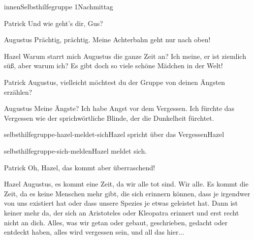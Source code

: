 \documentclass[12pt]{article}
\begin{document}
\begin{scene}[cut to]{innen}{Selbsthilfegruppe 1}{Nachmittag}
        \begin{dialog}{Patrick}
            Und wie geht's dir, Gus?
        \end{dialog}

        \begin{dialog}{Augustus}
            Prächtig, prächtig.
            Meine Achterbahn geht nur nach oben!
        \end{dialog}

        \begin{dialog}[IN Gedanken]{Hazel}
            Warum starrt mich Augustus die ganze Zeit an?
            Ich meine, er ist ziemlich süß, aber warum ich?
            Es gibt doch so viele schöne Mädchen in der Welt!
        \end{dialog}

        \begin{dialog}{Patrick}
            \gls{Augustus}, vielleicht möchtest du der Gruppe von deinen Ängsten erzählen?
        \end{dialog}

        \begin{dialog}{Augustus}
            Meine Ängste?
            Ich habe Angst vor dem Vergessen.
            Ich fürchte das Vergessen wie der sprichwörtliche Blinde, der die Dunkelheit fürchtet.
        \end{dialog}

        \begin{decision}{selbsthilfegruppe-hazel-meldet-sich}{\gls{Hazel} spricht über das Vergessen}{\gls{Hazel}}
            \begin{option}{selbsthilfegruppe-sich-melden}{\gls{Hazel} meldet sich.}

                \begin{dialog}{Patrick}
                    Oh, \gls{Hazel}, das kommt aber überraschend!
                \end{dialog}

                \begin{dialog}{Hazel}
                    Augustus, es kommt eine Zeit, da wir alle tot sind.
                    Wir alle.
                    Es kommt die Zeit, da es keine Menschen mehr gibt, die sich erinnern können, dass je irgendwer von uns existiert hat oder dass unsere Spezies je etwas geleistet hat.
                    Dann ist keiner mehr da, der sich an Aristoteles oder Kleopatra erinnert und erst recht nicht an dich.
                    Alles, was wir getan oder gebaut, geschrieben, gedacht oder entdeckt haben, alles wird vergessen sein, und all das hier...


\end{dialog}
\end{option}
\end{decision}
\end{scene}
\end{document}
